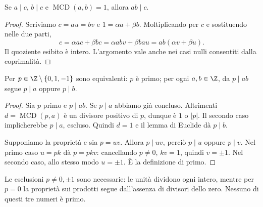 \begin{corollario}
Se $a\mid c$, $b\mid c$ e $\operatorname{MCD}(a,b)=1$, allora $ab\mid c$.
\end{corollario}
\begin{proof}
Scriviamo $c=au=bv$ e $1=\alpha a+\beta b$. Moltiplicando per $c$ e sostituendo nelle due parti,
\[
c=\alpha ac+\beta bc=\alpha abv+\beta bau=ab(\alpha v+\beta u).
\]
Il quoziente esibito è intero. L'argomento vale anche nei casi nulli consentiti dalla coprimalità.
\end{proof}

\begin{proposizione}\label{prop:primo-prodotto}
Per $p\in\Z\setminus\{0,1,-1\}$ sono equivalenti: $p$ è primo; per ogni $a,b\in\Z$, da $p\mid ab$ segue $p\mid a$ oppure $p\mid b$.
\end{proposizione}
\begin{proof}
\passomath{\Rightarrow} Sia $p$ primo e $p\mid ab$. Se $p\mid a$ abbiamo già concluso. Altrimenti $d=\operatorname{MCD}(p,a)$ è un divisore positivo di $p$, dunque è $1$ o $|p|$. Il secondo caso implicherebbe $p\mid a$, escluso. Quindi $d=1$ e il lemma di Euclide dà $p\mid b$.

\passomath{\Leftarrow} Supponiamo la proprietà e sia $p=uv$. Allora $p\mid uv$, perciò $p\mid u$ oppure $p\mid v$. Nel primo caso $u=pk$ dà $p=pkv$: cancellando $p\ne0$, $kv=1$, quindi $v=\pm1$. Nel secondo caso, allo stesso modo $u=\pm1$. È la definizione di primo.
\end{proof}

\begin{osservazione}
Le esclusioni $p\ne0,\pm1$ sono necessarie: le unità dividono ogni intero, mentre per $p=0$ la proprietà sui prodotti segue dall'assenza di divisori dello zero. Nessuno di questi tre numeri è primo.
\end{osservazione}

